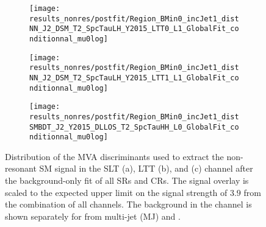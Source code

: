 \begin{figure}[htbp]
  \centering

  \begin{subfigure}{0.495\textwidth}
    \centering

    \texttt{[image: results\_nonres/postfit/Region\_BMin0\_incJet1\_distNN\_J2\_DSM\_T2\_SpcTauLH\_Y2015\_LTT0\_L1\_GlobalFit\_conditionnal\_mu0log]}

  \end{subfigure}\hfill%
  \begin{subfigure}{0.495\textwidth}
    \centering

    \texttt{[image: results\_nonres/postfit/Region\_BMin0\_incJet1\_distNN\_J2\_DSM\_T2\_SpcTauLH\_Y2015\_LTT1\_L1\_GlobalFit\_conditionnal\_mu0log]}

  \end{subfigure}

  \vspace{0.5em}

  \begin{subfigure}{0.495\textwidth}
    \centering

    \texttt{[image: results\_nonres/postfit/Region\_BMin0\_incJet1\_distSMBDT\_J2\_Y2015\_DLLOS\_T2\_SpcTauHH\_L0\_GlobalFit\_conditionnal\_mu0log]}

  \end{subfigure}

  \caption{Distribution of the MVA discriminants used to extract the
    non-resonant SM \HH signal in the \lephad SLT (a), \lephad LTT (b), and
    \hadhad (c) channel after the background-only fit of all SRs and CRs. The
    signal overlay is scaled to the expected upper limit on the signal strength
    of $3.9$ from the combination of all channels. The \faketauhadvis background
    in the \hadhad channel is shown separately for \faketauhadvis from multi-jet
    (MJ) and \ttbar.}%
  \label{fig:mvascores_postfit}
\end{figure}


